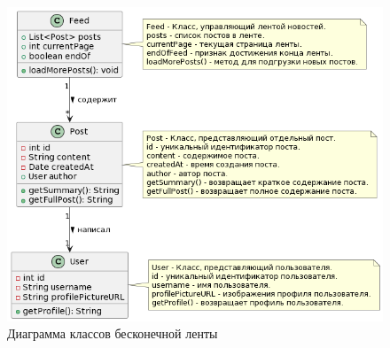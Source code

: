\begin{figure}[htb]
	\centering
	\includegraphics[width=.9\textwidth]{images/feed-diagram.png}
	\parskip=6pt
	\caption{Диаграмма классов бесконечной ленты}
	\label{fig:feedDiagram}
\end{figure}

